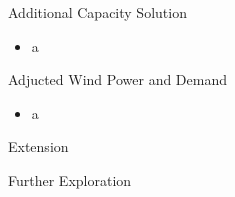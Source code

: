 \documentclass{beamer}
\begin{document}
    \begin{frame}{Additional Capacity Solution}
    
    	\begin{itemize}
    	\item a
    	\end{itemize}
    \end{frame}
    
    \begin{frame}{Adjucted Wind Power and Demand}
    
    	\begin{itemize}
    	\item a
    	\end{itemize}
    
    \end{frame}
    
    \begin{frame}{Extension}
    
    \end{frame}
    
    \begin{frame}{Further Exploration}
    
    \end{frame}
    
    
        
\end{document}
